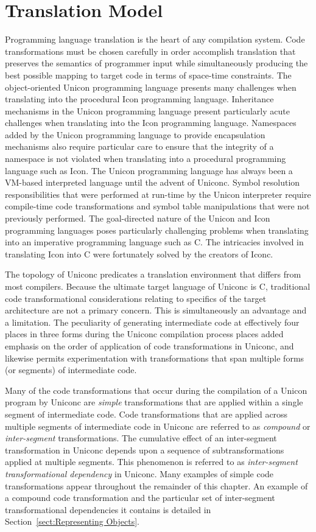 \section{Translation Model}

Programming language translation is the heart of any compilation
system. Code transformations must be chosen carefully in order
accomplish translation that preserves the semantics of programmer
input while simultaneously producing the best possible mapping to
target code in terms of space-time constraints. The object-oriented
Unicon programming language presents many challenges when translating
into the procedural Icon programming language. Inheritance mechanisms
in the Unicon programming language present particularly acute
challenges when translating into the Icon programming
language. Namespaces added by the Unicon programming language to
provide encapsulation mechanisms also require particular care to
ensure that the integrity of a namespace is not violated when
translating into a procedural programming language such as Icon.  The
Unicon programming language has always been a VM-based interpreted
language until the advent of Uniconc. Symbol resolution
responsibilities that were performed at \mbox{run-time} by the Unicon
interpreter require \mbox{compile-time} code transformations and
symbol table manipulations that were not previously performed. The
goal-directed nature of the Unicon and Icon programming languages
poses particularly challenging problems when translating into an
imperative programming language such as C. The intricacies involved in
translating Icon into C were fortunately solved by the creators of
Iconc.

The topology of Uniconc predicates a translation environment that differs from
most compilers. Because the ultimate target language of Uniconc is C,
traditional code transformational considerations relating to specifics of the
target architecture are not a primary concern. This is simultaneously an
advantage and a limitation. The peculiarity of generating intermediate code at
effectively four places in three forms during the Uniconc compilation process
places added emphasis on the order of application of code transformations in
Uniconc, and likewise permits experimentation with transformations that span
multiple forms (or segments) of intermediate code.

Many of the code transformations that occur during the compilation of a Unicon
program by Uniconc are {\em simple} transformations that are applied within a
single segment of intermediate code. Code transformations that are applied
across multiple segments of intermediate code in Uniconc are referred to as
{\em compound} or {\em inter-segment} transformations. The cumulative effect of
an inter-segment transformation in Uniconc depends upon a sequence of
subtransformations applied at multiple segments. This phenomenon is referred to
as {\em inter-segment transformational dependency} in Uniconc. Many examples of
simple code transformations appear throughout the remainder of this chapter. An
example of a compound code transformation and the particular set of
inter-segment transformational dependencies it contains is detailed in
Section~\ref{sect:Representing Objects}.

